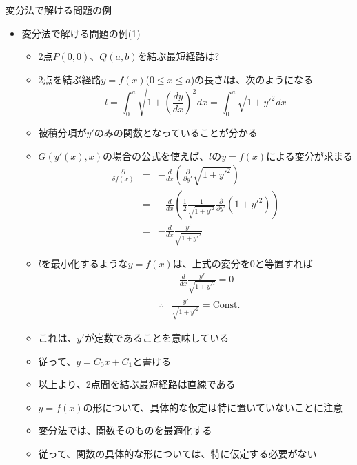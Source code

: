 \documentclass[dvipdfmx,notheorems,t]{beamer}
\begin{document}
\begin{frame}{変分法で解ける問題の例}

\begin{itemize}
	\item 変分法で解ける問題の例(1)
	\begin{itemize}
		\item 2点$P(0, 0)$、$Q(a, b)$を結ぶ最短経路は?
		\newline
		\item 2点を結ぶ経路$y = f(x)$($0 \le x \le a$)の長さ$l$は、次のようになる
		\begin{equation}
			l = \int_0^a \sqrt{1 + \left( \frac{dy}{dx} \right)^2} dx = \int_0^a \sqrt{1 + y'^2} dx
		\end{equation}
		
		\item 被積分項が$y'$のみの関数となっていることが分かる
		\item $G(y'(x), x)$の場合の公式を使えば、$l$の$y = f(x)$による変分が求まる
		\begin{eqnarray}
			\frac{\delta l}{\delta f(x)} &=& - \frac{d}{dx} \left( \frac{\partial}{\partial y'} \sqrt{1 + y'^2} \right) \\
			&=& - \frac{d}{dx} \left( \frac{1}{2} \frac{1}{\sqrt{1 + y'^2}} \frac{\partial}{\partial y'} \left( 1 + y'^2 \right) \right) \\
			&=& - \frac{d}{dx} \frac{y'}{\sqrt{1 + y'^2}}
		\end{eqnarray}
		
		\item $l$を最小化するような$y = f(x)$は、上式の変分を$0$と等置すれば
		\begin{eqnarray}
			&& - \frac{d}{dx} \frac{y'}{\sqrt{1 + y'^2}} = 0 \\
			&\therefore& \frac{y'}{\sqrt{1 + y'^2}} = \mathrm{Const.}
		\end{eqnarray}
		
		\item これは、\color{red}$y'$が定数である\normalcolor ことを意味している
		\item 従って、\color{red}$y = C_0 x + C_1$\normalcolor と書ける
		\newline
		\item 以上より、\color{red}2点間を結ぶ最短経路は直線\normalcolor である
		\newline
		\item $y = f(x)$の形について、\alert{具体的な仮定は特に置いていない}ことに注意
		\item 変分法では、\alert{関数そのものを最適化する}
		\item 従って、関数の具体的な形については、特に仮定する必要がない
	\end{itemize}
\end{itemize}

\end{frame}
\end{document}
